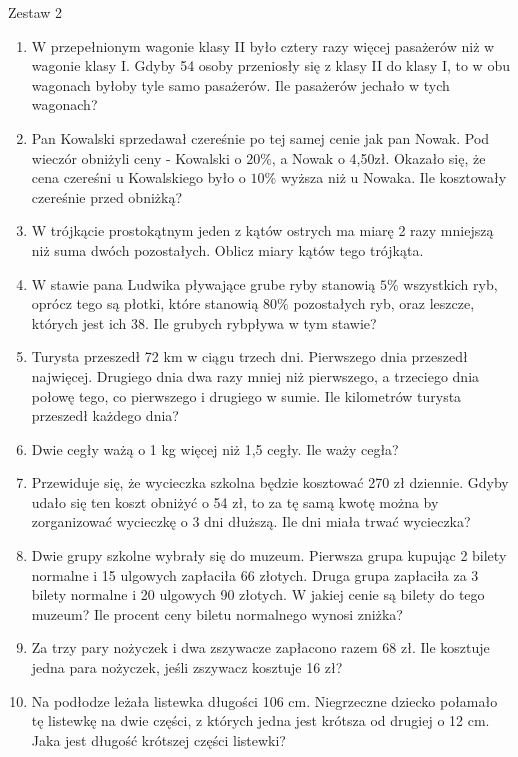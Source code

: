 \documentclass[12pt,a4paper]{article}
\begin{document}
\newpage
	\LARGE \begin{center}
	Zestaw 2
\end{center}
\normalsize 
\begin{enumerate}[1.]
	\item W przepełnionym wagonie klasy II było cztery razy więcej pasażerów niż w wagonie klasy I. Gdyby 54 osoby przeniosły się z klasy II do klasy I, to w obu wagonach byłoby tyle samo pasażerów. Ile pasażerów jechało w tych wagonach?
	\item Pan Kowalski sprzedawał czereśnie po tej samej cenie jak pan Nowak. Pod wieczór obniżyli ceny - Kowalski o $20\%$, a Nowak o 4,50zł. Okazało się, że cena czereśni u Kowalskiego było o $10\%$ wyższa niż u Nowaka. Ile kosztowały czereśnie przed obniżką?
	\item W trójkącie prostokątnym jeden z kątów ostrych ma miarę 2 razy mniejszą niż suma dwóch pozostałych. Oblicz miary kątów tego trójkąta.
	\item W stawie pana Ludwika pływające grube ryby stanowią $5\%$ wszystkich ryb, oprócz tego są płotki, które stanowią $80\%$ pozostałych ryb, oraz leszcze, których jest ich 38. Ile grubych rybpływa w tym stawie?
	\item Turysta przeszedł 72 km w ciągu trzech dni. Pierwszego dnia przeszedł najwięcej. Drugiego dnia dwa razy mniej niż pierwszego, a trzeciego dnia połowę tego, co pierwszego i drugiego w sumie. Ile kilometrów turysta przeszedł każdego dnia?
	\item Dwie cegły ważą o 1 kg więcej niż 1,5 cegły. Ile waży cegła?
	\item Przewiduje się, że wycieczka szkolna będzie kosztować 270 zł dziennie. Gdyby
	udało się ten koszt obniżyć o 54 zł, to za tę samą kwotę można by zorganizować wycieczkę o 3 dni dłuższą. Ile dni miała trwać wycieczka?
	\item Dwie grupy szkolne wybrały się do muzeum. Pierwsza grupa kupując 2 bilety normalne i 15 ulgowych zapłaciła 66 złotych. Druga grupa zapłaciła za 3 bilety normalne i 20 ulgowych 90 złotych. W jakiej cenie są bilety do tego muzeum? Ile procent ceny biletu normalnego wynosi zniżka?
	\item Za trzy pary nożyczek i dwa zszywacze zapłacono razem 68 zł. Ile kosztuje jedna para nożyczek, jeśli zszywacz kosztuje 16 zł?
	\item Na podłodze leżała listewka długości 106 cm. Niegrzeczne dziecko połamało tę listewkę na	dwie części, z których jedna jest krótsza od drugiej o 12 cm. Jaka jest długość krótszej części listewki?
\end{enumerate}
\end{document}
